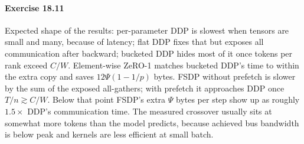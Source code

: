 \paragraph{Exercise 18.11}
Expected shape of the results: per-parameter DDP is slowest when tensors are small and many, because
of latency; flat DDP fixes that but exposes all communication after backward; bucketed DDP hides
most of it once tokens per rank exceed $C/W$. Element-wise ZeRO-1 matches bucketed DDP's time to
within the extra copy and saves $12\Psi(1-1/p)$ bytes. FSDP without prefetch is slower by the sum of the
exposed all-gathers; with prefetch it approaches DDP once $T/n \gtrsim C/W$. Below that point FSDP's
extra $\Psi$ bytes per step show up as roughly $1.5\times$ DDP's communication time. The measured
crossover usually sits at somewhat more tokens than the model predicts, because achieved bus
bandwidth is below peak and kernels are less efficient at small batch.
